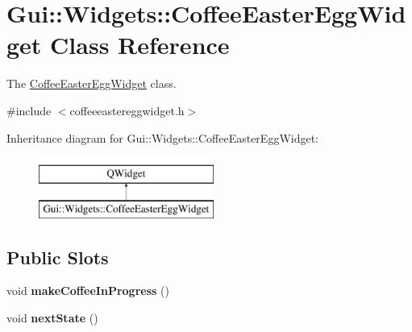 \hypertarget{classGui_1_1Widgets_1_1CoffeeEasterEggWidget}{\section{Gui\-:\-:Widgets\-:\-:Coffee\-Easter\-Egg\-Widget Class Reference}
\label{classGui_1_1Widgets_1_1CoffeeEasterEggWidget}
}


The \hyperlink{classGui_1_1Widgets_1_1CoffeeEasterEggWidget}{Coffee\-Easter\-Egg\-Widget} class.  




{\ttfamily \#include $<$coffeeeastereggwidget.\-h$>$}

Inheritance diagram for Gui\-:\-:Widgets\-:\-:Coffee\-Easter\-Egg\-Widget\-:\begin{figure}[H]
\begin{center}
\leavevmode
\includegraphics[height=2.000000cm]{dc/ddf/classGui_1_1Widgets_1_1CoffeeEasterEggWidget}
\end{center}
\end{figure}
\subsection*{Public Slots}
\begin{DoxyCompactItemize}
\item 
\hypertarget{classGui_1_1Widgets_1_1CoffeeEasterEggWidget_ab078e63e3a8b1b2c363869f66e5a6633}{void {\bfseries make\-Coffee\-In\-Progress} ()}\label{classGui_1_1Widgets_1_1CoffeeEasterEggWidget_ab078e63e3a8b1b2c363869f66e5a6633}

\item 
\hypertarget{classGui_1_1Widgets_1_1CoffeeEasterEggWidget_accaae451a705877710d40fd19723df80}{void {\bfseries next\-State} ()}\label{classGui_1_1Widgets_1_1CoffeeEasterEggWidget_accaae451a705877710d40fd19723df80}

\end{DoxyCompactItemize}
